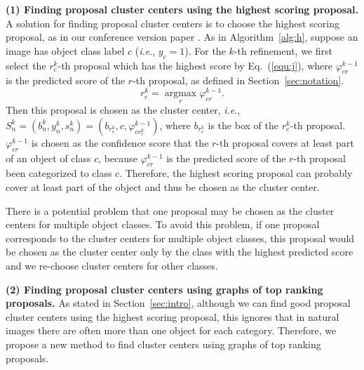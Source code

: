 \documentclass[10pt,journal,compsoc]{IEEEtran}
\DeclareMathOperator*{\argmax}{argmax}
\def\ie{\emph{i.e}.} \def\Ie{\emph{I.e}.}
\begin{document}
\vspace{0.1cm}
\noindent\textbf{(1) Finding proposal cluster centers using the highest scoring proposal.}
A solution for finding proposal cluster centers is to choose the highest scoring proposal,
as in our conference version paper \cite{Ref:Tang2017multiple}.
As in Algorithm~\ref{alg:h}, suppose an image has object class label $c$ (\ie, $y_{c}=1$).
For the $k$-th refinement,
we first select the $r^{k}_{c}$-th proposal which has the highest score by Eq.~(\ref{equ:j}),
where $\varphi^{k-1}_{cr}$ is the predicted score of the $r$-th proposal,
as defined in Section~\ref{sec:notation}.
\begin{equation}
\label{equ:j}
   r^{k}_{c} = \mathop{\argmax}\limits_{r} \varphi^{k-1}_{cr}.
\end{equation}
Then this proposal is chosen as the cluster center, \ie, $S^{k}_{n} = (b^{k}_{n}, y^{k}_{n}, s^{k}_{n}) = (b_{r^{k}_{c}}, c, \varphi^{k-1}_{cr^{k}_{c}})$,
where $b_{r^{k}_{c}}$ is the box of the $r^{k}_{c}$-th proposal.
$\varphi^{k-1}_{cr}$ is chosen as the confidence score that the $r$-th proposal covers at least part of an object of class $c$,
because $\varphi^{k-1}_{cr}$ is the predicted score of the $r$-th proposal been categorized to class $c$.
Therefore, the highest scoring proposal can probably cover at least part of the object
and thus be chosen as the cluster center.

There is a potential problem that one proposal may be chosen as the cluster centers for multiple object classes.
To avoid this problem,
if one proposal corresponds to the cluster centers for multiple object classes,
this proposal would be chosen as the cluster center only by the class with the highest predicted score
and we re-choose cluster centers for other classes.



\vspace{0.1cm}
\noindent\textbf{(2) Finding proposal cluster centers using graphs of top ranking proposals.}
As stated in Section~\ref{sec:intro},
although we can find good proposal cluster centers using the highest scoring proposal,
this ignores that in natural images there are often more than one object for each category.
Therefore, we propose a new method to find cluster centers using graphs of top ranking proposals.
\end{document}
